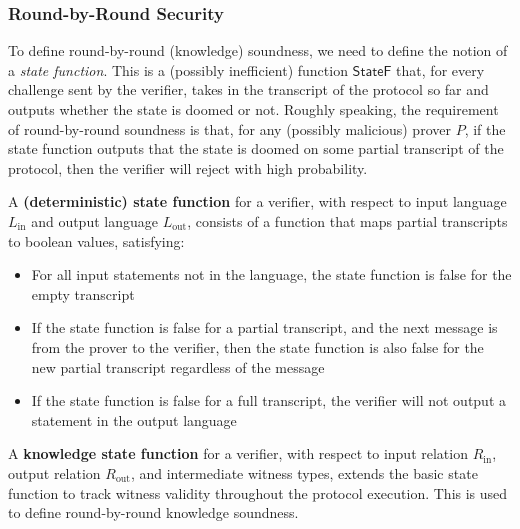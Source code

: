 \subsubsection{Round-by-Round Security}

To define round-by-round (knowledge) soundness, we need to define the notion of a \emph{state function}. This is a (possibly inefficient) function $\mathsf{StateF}$ that, for every challenge sent by the verifier, takes in the transcript of the protocol so far and outputs whether the state is doomed or not. Roughly speaking, the requirement of round-by-round soundness is that, for any (possibly malicious) prover $P$, if the state function outputs that the state is doomed on some partial transcript of the protocol, then the verifier will reject with high probability.

\begin{definition}
    \label{def:state_function}
    A \textbf{(deterministic) state function} for a verifier, with respect to input language $L_{\text{in}}$ and
    output language $L_{\text{out}}$, consists of a function that maps partial transcripts to boolean values, satisfying:
    \begin{itemize}
        \item For all input statements not in the language, the state function is false for the empty transcript
        \item If the state function is false for a partial transcript, and the next message is from the
        prover to the verifier, then the state function is also false for the new partial transcript
        regardless of the message
        \item If the state function is false for a full transcript, the verifier will not output a statement
        in the output language
    \end{itemize}
\end{definition}

\begin{definition}
    \label{def:knowledge_state_function}
    A \textbf{knowledge state function} for a verifier, with respect to input relation $R_{\text{in}}$, output
    relation $R_{\text{out}}$, and intermediate witness types, extends the basic state function to track
    witness validity throughout the protocol execution. This is used to define round-by-round knowledge soundness.
\end{definition}

